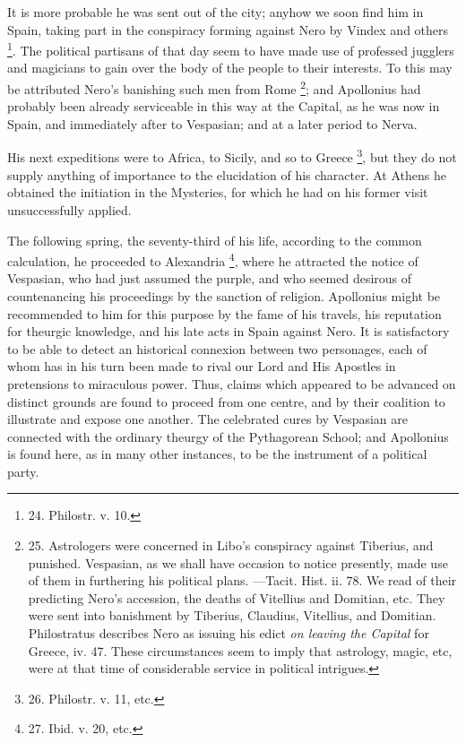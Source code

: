 It is more probable he was
sent out of the city; anyhow we soon find him in Spain, taking part in
the conspiracy forming against Nero by Vindex and others \footnote{24.
Philostr. v. 10.}. The political partisans of that day seem to have made use of
professed jugglers and magicians to gain over the body of the people
to their interests. To this may be attributed Nero's banishing such
men from Rome \footnote{25.
Astrologers were concerned in Libo's conspiracy against Tiberius, and
punished. Vespasian, as we shall have occasion to notice presently,
made use of them in furthering his political plans. —Tacit. Hist.
ii. 78. We read of their predicting Nero's accession, the deaths of
Vitellius and Domitian, etc. They were sent into banishment by
Tiberius, Claudius, Vitellius, and Domitian. Philostratus describes
Nero as issuing his edict \emph{on leaving the Capital} for Greece,
iv. 47. These circumstances seem to imply that astrology, magic, etc,
were at that time of considerable service in political intrigues.}; and
Apollonius had probably been already serviceable in this way at the
Capital, as he was now in Spain, and immediately after to Vespasian;
and at a later period to Nerva.

His next expeditions were to
Africa, to Sicily, and so to Greece \footnote{26.
Philostr. v. 11, etc.}, but they do not supply anything of importance to the
elucidation of his character. At Athens he obtained the initiation in
the Mysteries, for which he had on his former visit unsuccessfully
applied.

The following spring, the
seventy-third of his life, according to the common calculation, he
proceeded to Alexandria \footnote{27.
Ibid. v. 20, etc.},
where he attracted the notice of Vespasian, who had just assumed the
purple, and who seemed desirous of countenancing his proceedings by
the sanction of religion. Apollonius might be recommended to him for this purpose by the fame of his travels, his reputation for
theurgic knowledge, and his late acts in Spain against Nero. It is
satisfactory to be able to detect an historical connexion between two
personages, each of whom has in his turn been made to rival our Lord
and His Apostles in pretensions to miraculous power. Thus, claims
which appeared to be advanced on distinct grounds are found to proceed
from one centre, and by their coalition to illustrate and expose one
another. The celebrated cures by Vespasian are connected with the
ordinary theurgy of the Pythagorean School; and Apollonius is found
here, as in many other instances, to be the instrument of a political
party.

